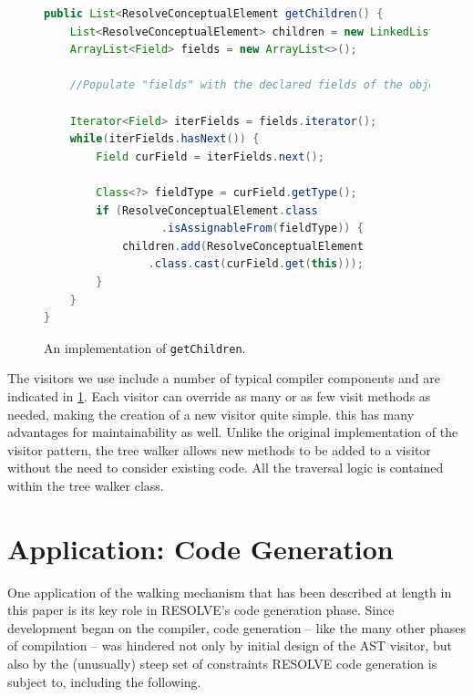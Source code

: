 \documentclass[times]{speauth}
\begin{document}
\begin{figure}[!htb]
\centering
\begin{minipage}{.80\textwidth}
\begin{lstlisting}[language=java]
public List<ResolveConceptualElement getChildren() {
    List<ResolveConceptualElement> children = new LinkedList<>();
    ArrayList<Field> fields = new ArrayList<>();
    
    //Populate "fields" with the declared fields of the object's defining class
    
    Iterator<Field> iterFields = fields.iterator();
    while(iterFields.hasNext()) {
        Field curField = iterFields.next();
        
        Class<?> fieldType = curField.getType();
        if (ResolveConceptualElement.class
                  .isAssignableFrom(fieldType)) {
            children.add(ResolveConceptualElement
                .class.cast(curField.get(this)));
        }
    }
}
\end{lstlisting}
\end{minipage}
\caption{An implementation of \texttt{getChildren}.}
\label{fig:getchildren}
\end{figure}


The visitors we use include a number of typical compiler components and are indicated in \ref{fig:getchildren}. Each visitor can override as many or as few visit methods as needed, making the creation of a new visitor quite simple. this has many advantages for maintainability as well. Unlike the original implementation of the visitor pattern, the tree walker allows new methods to be added to a visitor without the need to consider existing code. All the traversal logic is contained within the tree walker class. 


\section{Application: Code Generation}
\vspace{-2pt}

One application of the walking mechanism that has been described at length in this paper is its key role in RESOLVE's code generation phase. Since development began on the compiler, code generation -- like the many other phases of compilation -- was hindered not only by initial design of the AST visitor, but also by the (unusually) steep set of constraints RESOLVE code generation is subject to, including the following.
\end{document}
